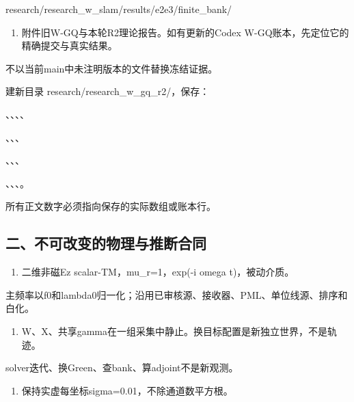 \documentclass[
  10pt,
  a4paper,
]{article}
\providecommand{\tightlist}{%
  \setlength{\itemsep}{0pt}\setlength{\parskip}{0pt}}
\providecommand{\tightlist}{\setlength{\itemsep}{1pt}\setlength{\parskip}{1pt}}
\begin{document}
research/research\_w\_slam/results/e2e3/finite\_bank/

\begin{enumerate}
\def\labelenumi{\arabic{enumi}.}
\setcounter{enumi}{4}
\tightlist
\item
  附件旧W-GQ与本轮R2理论报告。如有更新的Codex
  W-GQ账本，先定位它的精确提交与真实结果。
\end{enumerate}

不以当前main中未注明版本的文件替换冻结证据。

建新目录 research/research\_w\_gq\_r2/，保存：

、、、、

、、、

、、、

、、、。

所有正文数字必须指向保存的实际数组或账本行。

\hypertarget{ux4e8cux4e0dux53efux6539ux53d8ux7684ux7269ux7406ux4e0eux63a8ux65adux5408ux540c}{%
\subsection{二、不可改变的物理与推断合同}\label{ux4e8cux4e0dux53efux6539ux53d8ux7684ux7269ux7406ux4e0eux63a8ux65adux5408ux540c}}

\begin{enumerate}
\def\labelenumi{\arabic{enumi}.}
\tightlist
\item
  二维非磁Ez scalar-TM，mu\_r=1，exp(-i omega t)，被动介质。
\end{enumerate}

主频率以f0和lambda0归一化；沿用已审核源、接收器、PML、单位线源、排序和白化。

\begin{enumerate}
\def\labelenumi{\arabic{enumi}.}
\setcounter{enumi}{1}
\tightlist
\item
  W、X、共享gamma在一组采集中静止。换目标配置是新独立世界，不是轨迹。
\end{enumerate}

solver迭代、换Green、查bank、算adjoint不是新观测。

\begin{enumerate}
\def\labelenumi{\arabic{enumi}.}
\setcounter{enumi}{2}
\tightlist
\item
  保持实虚每坐标sigma=0.01，不除通道数平方根。
\end{enumerate}
\end{document}
